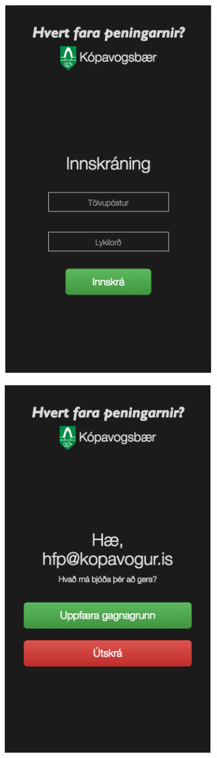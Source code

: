 \documentclass{article}
\theoremstyle{blueP}
\theoremstyle{greenS}
\begin{document}
\begin{figure}[H]
\centering
\begin{minipage}{.5\textwidth}
  \centering
  \includegraphics[width=.6\linewidth]{./Admin_login.png}
  \label{fig:adminLogin}
\end{minipage}%
\begin{minipage}{.5\textwidth}
  \centering
  \includegraphics[width=.6\linewidth]{./Admin_signed_in.png}
  \label{fig:admin_signed_in}
\end{minipage}
\end{figure}
\end{document}
